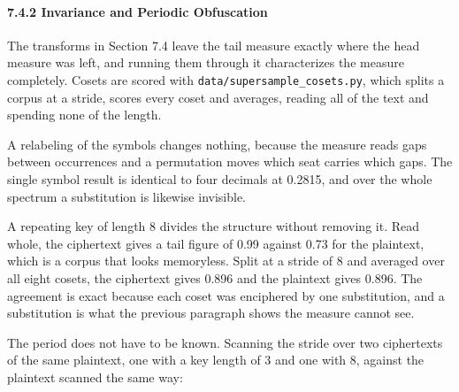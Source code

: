 \paragraph{7.4.2 Invariance and Periodic Obfuscation}

The transforms in Section 7.4 leave the tail measure exactly where the head measure was left, and running them through it characterizes the measure completely. Cosets are scored with \texttt{data/\allowbreak{}supersample\_\allowbreak{}cosets.\allowbreak{}py}, which splits a corpus at a stride, scores every coset and averages, reading all of the text and spending none of the length.

A relabeling of the symbols changes nothing, because the measure reads gaps between occurrences and a permutation moves which seat carries which gaps. The single symbol result is identical to four decimals at 0.2815, and over the whole spectrum a substitution is likewise invisible.

A repeating key of length 8 divides the structure without removing it. Read whole, the ciphertext gives a tail figure of 0.99 against 0.73 for the plaintext, which is a corpus that looks memoryless. Split at a stride of 8 and averaged over all eight cosets, the ciphertext gives 0.896 and the plaintext gives 0.896. The agreement is exact because each coset was enciphered by one substitution, and a substitution is what the previous paragraph shows the measure cannot see.

The period does not have to be known. Scanning the stride over two ciphertexts of the same plaintext, one with a key length of 3 and one with 8, against the plaintext scanned the same way:

